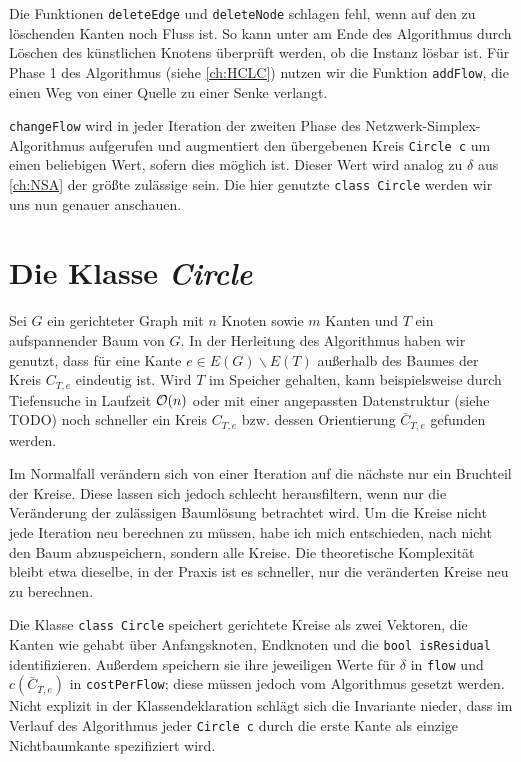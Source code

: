 Die Funktionen \lstinline|deleteEdge| und \lstinline|deleteNode| schlagen fehl, wenn auf den zu löschenden Kanten noch Fluss ist. So kann unter am Ende des Algorithmus durch Löschen des künstlichen Knotens überprüft werden, ob die Instanz lösbar ist. Für Phase 1 des Algorithmus (siehe \cref{ch:HCLC}) nutzen wir die Funktion \lstinline|addFlow|, die einen Weg von einer Quelle zu einer Senke verlangt.

\lstinline|changeFlow| wird in jeder Iteration der zweiten Phase des Netzwerk-Simplex-Algorithmus aufgerufen und augmentiert den übergebenen Kreis \lstinline|Circle c| um einen beliebigen Wert, sofern dies möglich ist. Dieser Wert wird analog zu $\delta$ aus \cref{ch:NSA} der größte zulässige sein. Die hier genutzte \lstinline|class Circle| werden wir uns nun genauer anschauen.

\section{Die Klasse \emph{Circle}}
Sei $G$ ein gerichteter Graph mit $n$ Knoten sowie $m$ Kanten und $T$ ein aufspannender Baum von $G$. In der Herleitung des Algorithmus haben wir genutzt, dass für eine Kante $e\in E(G)\backslash E(T)$ außerhalb des Baumes der Kreis $C_{T,e}$ eindeutig ist. Wird $T$ im Speicher gehalten, kann beispielsweise durch Tiefensuche in Laufzeit $\mathcal{O}(n)$ oder mit einer angepassten Datenstruktur (siehe TODO) noch schneller ein Kreis $C_{T,e}$ bzw. dessen Orientierung $\bar{C}_{T,e}$ gefunden werden.

Im Normalfall verändern sich von einer Iteration auf die nächste nur ein Bruchteil der Kreise. Diese lassen sich jedoch schlecht herausfiltern, wenn nur die Veränderung der zulässigen Baumlösung betrachtet wird. Um die Kreise nicht jede Iteration neu berechnen zu müssen, habe ich mich entschieden, nach \cite{betreuer} nicht den Baum abzuspeichern, sondern alle Kreise. Die theoretische Komplexität bleibt etwa dieselbe,\footnotemark{} in der Praxis ist es schneller, nur die veränderten Kreise neu zu berechnen.


Die Klasse \lstinline|class Circle| speichert gerichtete Kreise als zwei Vektoren, die Kanten wie gehabt über Anfangsknoten, Endknoten und die \lstinline|bool isResidual| identifizieren. Außerdem speichern sie ihre jeweiligen Werte für $\delta$ in \lstinline|flow| und $c(\bar{C}_{T,e})$ in \lstinline|costPerFlow|; diese müssen jedoch vom Algorithmus gesetzt werden. Nicht explizit in der Klassendeklaration schlägt sich die Invariante nieder, dass im Verlauf des Algorithmus jeder \lstinline|Circle c| durch die erste Kante als einzige Nichtbaumkante spezifiziert wird.

